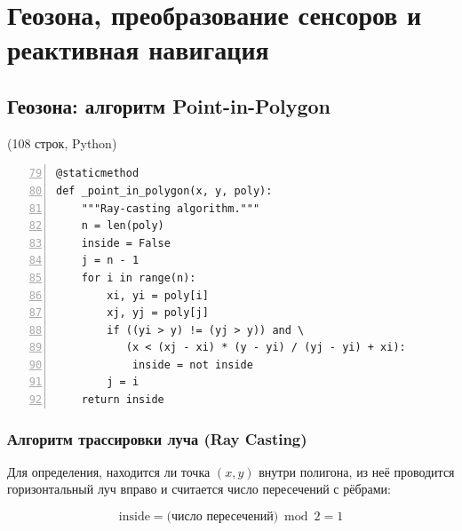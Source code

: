 \chapter{Геозона, преобразование сенсоров и реактивная навигация}
\label{ch:geofence_sensors}

\section{Геозона: алгоритм Point-in-Polygon}

\begin{filebox}[title={Файл исходного кода}]
 \quad (108 строк, Python)
\end{filebox}

\begin{filebox}[title={\filepath{geofence\_map\_publisher.py}, строки 79--91 --- \_point\_in\_polygon()}]
\begin{lstlisting}[style=pythonstyle, numbers=left, firstnumber=79]
@staticmethod
def _point_in_polygon(x, y, poly):
    """Ray-casting algorithm."""
    n = len(poly)
    inside = False
    j = n - 1
    for i in range(n):
        xi, yi = poly[i]
        xj, yj = poly[j]
        if ((yi > y) != (yj > y)) and \
           (x < (xj - xi) * (y - yi) / (yj - yi) + xi):
            inside = not inside
        j = i
    return inside
\end{lstlisting}
\end{filebox}

\subsection{Алгоритм трассировки луча (Ray Casting)}

Для определения, находится ли точка $(x, y)$ внутри полигона,
из неё проводится горизонтальный луч вправо и считается число
пересечений с рёбрами:

\begin{equation}
  \text{inside} = \bigl(\text{число пересечений}\bigr) \bmod 2 = 1
  \label{eq:raycasting}
\end{equation}

